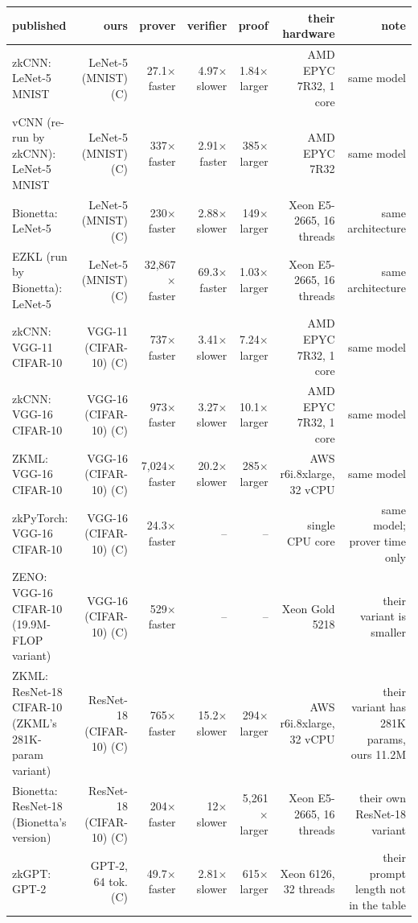 \begin{tabular}{lrrrrrr}
\toprule
published & ours & prover & verifier & proof & their hardware & note \\
\midrule
zkCNN: LeNet-5 MNIST & LeNet-5 (MNIST) (C) & 27.1$\times$ faster & 4.97$\times$ slower & 1.84$\times$ larger & AMD EPYC 7R32, 1 core & same model \\
vCNN (re-run by zkCNN): LeNet-5 MNIST & LeNet-5 (MNIST) (C) & 337$\times$ faster & 2.91$\times$ faster & 385$\times$ larger & AMD EPYC 7R32 & same model \\
Bionetta: LeNet-5 & LeNet-5 (MNIST) (C) & 230$\times$ faster & 2.88$\times$ slower & 149$\times$ larger & Xeon E5-2665, 16 threads & same architecture \\
EZKL (run by Bionetta): LeNet-5 & LeNet-5 (MNIST) (C) & 32,867$\times$ faster & 69.3$\times$ faster & 1.03$\times$ larger & Xeon E5-2665, 16 threads & same architecture \\
zkCNN: VGG-11 CIFAR-10 & VGG-11 (CIFAR-10) (C) & 737$\times$ faster & 3.41$\times$ slower & 7.24$\times$ larger & AMD EPYC 7R32, 1 core & same model \\
zkCNN: VGG-16 CIFAR-10 & VGG-16 (CIFAR-10) (C) & 973$\times$ faster & 3.27$\times$ slower & 10.1$\times$ larger & AMD EPYC 7R32, 1 core & same model \\
ZKML: VGG-16 CIFAR-10 & VGG-16 (CIFAR-10) (C) & 7,024$\times$ faster & 20.2$\times$ slower & 285$\times$ larger & AWS r6i.8xlarge, 32 vCPU & same model \\
zkPyTorch: VGG-16 CIFAR-10 & VGG-16 (CIFAR-10) (C) & 24.3$\times$ faster & – & – & single CPU core & same model; prover time only \\
ZENO: VGG-16 CIFAR-10 (19.9M-FLOP variant) & VGG-16 (CIFAR-10) (C) & 529$\times$ faster & – & – & Xeon Gold 5218 & their variant is smaller \\
ZKML: ResNet-18 CIFAR-10 (ZKML's 281K-param variant) & ResNet-18 (CIFAR-10) (C) & 765$\times$ faster & 15.2$\times$ slower & 294$\times$ larger & AWS r6i.8xlarge, 32 vCPU & their variant has 281K params, ours 11.2M \\
Bionetta: ResNet-18 (Bionetta's version) & ResNet-18 (CIFAR-10) (C) & 204$\times$ faster & 12$\times$ slower & 5,261$\times$ larger & Xeon E5-2665, 16 threads & their own ResNet-18 variant \\
zkGPT: GPT-2 & GPT-2, 64 tok. (C) & 49.7$\times$ faster & 2.81$\times$ slower & 615$\times$ larger & Xeon 6126, 32 threads & their prompt length not in the table \\

\end{tabular}
